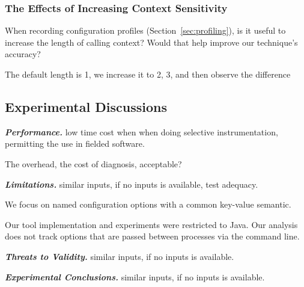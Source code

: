 \subsubsection{The Effects of Increasing Context Sensitivity}

When recording configuration profiles (Section~\ref{sec:profiling}), is it useful
to increase the length of calling context? Would that help improve our technique's accuracy?

The default length is 1, we increase it to 2, 3, and then observe the difference

\subsection{Experimental Discussions}

\noindent \textbf{\textit{Performance.}} low time cost when when doing
selective instrumentation, permitting the use in fielded software.

The overhead, the cost of diagnosis, acceptable?

\vspace{1mm}

\noindent \textbf{\textit{Limitations.}} similar inputs, if no inputs is available, test adequacy.

We focus on named configuration options with a common key-value semantic.

Our tool implementation and experiments were restricted to Java. Our analysis
does not track options that are passed between processes via the command line.

\vspace{1mm}

\noindent \textbf{\textit{Threats to Validity.}} similar inputs, if no inputs is available.

\vspace{1mm}

\noindent \textbf{\textit{Experimental Conclusions.}} similar inputs, if no inputs is available.

